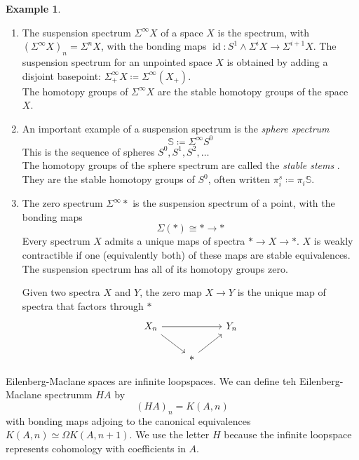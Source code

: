 \documentclass[notitlepage,12pt]{article}
\theoremstyle{definition}
\newtheorem{example}[theorem]{Example}
\theoremstyle{para}{\normalfont}
\begin{document}
\begin{example}
    \begin{enumerate}
    \item The suspension spectrum $\Sigma^{\infty } X$ of a space $X$ is the spectrum, with $(\Sigma^{\infty } X)_n=\Sigma^nX$, with the bonding maps $\operatorname*{id }:S^1\wedge \Sigma^iX\to \Sigma^{i+1 } X$. The suspension spectrum for an unpointed space $X$ is obtained by adding a disjoint basepoint: $\Sigma^{\infty } _+X\coloneqq \Sigma^{\infty } (X_+)$. \\
    The homotopy groups of $\Sigma^{\infty } X$ are the stable homotopy groups of the space $X$. 
        \item An important example of a suspension spectrum is the \textit{sphere spectrum} $$\mathbb{S}\coloneqq \Sigma^{\infty } S^0$$ This is the sequence of spheres $S^0,S^1,S^2,\dots$ \\
        The homotopy groups of the sphere spectrum are called the \textit{stable stems }. They are the stable homotopy groups of $S^0$, often written $\pi_i^s\coloneqq \pi_i \mathbb{S}$.
    \item The zero spectrum $\Sigma^{\infty}*$ is the suspension spectrum of a point, with the bonding maps 
    \[
        \Sigma(*)\cong * \to *
    \] 
    Every spectrum $X$ admits a unique maps of spectra $*\to X\to *$. $X$ is weakly contractible if one (equivalently both) of these maps are stable equivalences. \\
    The suspension spectrum has all of its homotopy groups zero. 

    Given two spectra $X$ and $Y$, the zero map $X\to Y$ is the unique map of spectra that factors through $*$
    \[
        \begin{tikzcd}
X_n \arrow[rd] \arrow[rr] &              & Y_n \\
                          & * \arrow[ru] &    
\end{tikzcd}
    \]
    \end{enumerate}
    \item Eilenberg-Maclane spaces are infinite loopspaces. We can define teh Eilenberg-Maclane spectrumm $HA$ by 
    \[
        (HA)_n=K(A,n)
    \] with bonding maps adjoing to the canonical equivalences $K(A,n)\simeq \Omega K(A,n+1)$. We use the letter $H$ because the infinite loopspace represents cohomology with coefficients in $A$. 


\end{example}
\end{document}
